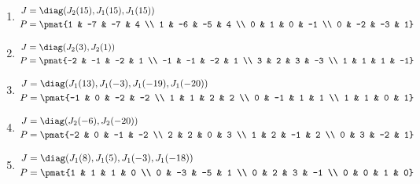 \begin{enumerate}
\item

\begin{align*}
J &= \diag(J_{2}(15), J_{1}(15), J_{1}(15))\\
P &= \pmat{1 & -7 & -7 & 4 \\ 1 & -6 & -5 & 4 \\ 0 & 1 & 0 & -1 \\ 0 & -2 & -3 & 1}
\end{align*}

\item

\begin{align*}
J &= \diag(J_{2}(3), J_{2}(1))\\
P &= \pmat{-2 & -1 & -2 & 1 \\ -1 & -1 & -2 & 1 \\ 3 & 2 & 3 & -3 \\ 1 & 1 & 1 & -1}
\end{align*}

\item

\begin{align*}
J &= \diag(J_{1}(13), J_{1}(-3), J_{1}(-19), J_{1}(-20))\\
P &= \pmat{-1 & 0 & -2 & -2 \\ 1 & 1 & 2 & 2 \\ 0 & -1 & 1 & 1 \\ 1 & 1 & 0 & 1}
\end{align*}

\item

\begin{align*}
J &= \diag(J_{2}(-6), J_{2}(-20))\\
P &= \pmat{-2 & 0 & -1 & -2 \\ 2 & 2 & 0 & 3 \\ 1 & 2 & -1 & 2 \\ 0 & 3 & -2 & 1}
\end{align*}

\item

\begin{align*}
J &= \diag(J_{1}(8), J_{1}(5), J_{1}(-3), J_{1}(-18))\\
P &= \pmat{1 & 1 & 1 & 0 \\ 0 & -3 & -5 & 1 \\ 0 & 2 & 3 & -1 \\ 0 & 0 & 1 & 0}
\end{align*}


\end{enumerate}
